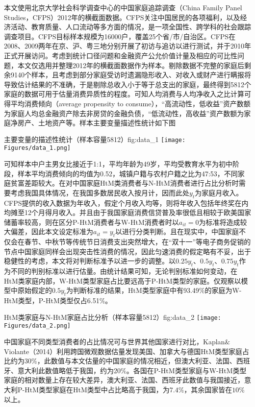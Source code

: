 \documentclass[supercite]{HustGraduPaper}
\begin{document}
    本文使用北京大学社会科学调查中心的中国家庭追踪调查（China Family Panel Studies，CFPS）2012年的横截面数据。CFPS关注中国居民的各项福利，以及经济活动、教育质量、人口流动等多方面的情况，是一项全国性、跨学科的社会跟踪调查项目。CFPS目标样本规模为16000户，覆盖25个省/市/自治区。CFPS在2008、2009两年在京、沪、粤三地分别开展了初访与追访以进行测试，并于2010年正式开展访问。考虑到统计口径问题和金融资产公允价值计量及相应的可比性问题，本文仅选用并整理2012年的横截面数据作为样本。剔除数据不完整的家庭后剩余9140个样本，且考虑到部分家庭受访时遗漏隐形收入、对收入或财产进行瞒报将导致估计结果的不准确，于是剔除总收入小于等于总支出的家庭，最终得到5812个家庭的数据可用于估量消费异质性的程度。可知人均消费与人均净收入之比计算可得平均消费倾向（average propensity to consume），“高流动性，低收益”资产数额为家庭人均总金融资产除去非房贷的金融负债，“低流动性，高收益”资产数额为家庭净房产、土地资产等。样本主要变量描述性统计如下图
    \begin{generalfig}[htbp]{主要变量的描述性统计（样本容量5812）}{fig:data_1}
    \texttt{[image: Figures/data\_1.png]}
    \end{generalfig}
    
    可知样本中户主男女比接近于1:1，平均年龄为49岁，平均受教育水平为初中阶段，样本平均消费倾向的均值为0.52，城镇户籍与农村户籍之比为47:53，不同家庭贫富差距较大。在对中国家庭HtM类消费者与N-HtM消费者进行占比分析时需要考虑我国具体情况，在我国多数居民收入按月计，因而此处$y_t$为家庭月收入。CFPS提供的收入数据为年收入，假定个月收入均等，则将年收入包括年终奖在内均摊至12个月得月收入。并且由于我国家庭消费信贷普及率很低且相较于欧美国家储蓄率较高，则在区分P-HtM消费者与W-HtM消费者时以$a_{it}=0$为标准将造成较大偏差，因此本文设定标准为$a_{it}=y_t$以进行分类判断。且在现实中，中国家庭不仅会在春节、中秋节等传统节日消费支出突然增大，在“双十一”等电子商务促销的节点中国家庭同样会出现突击性消费的情况，因此匀速消费的假定略有不妥，出于稳健性的考虑，本文将对判断标准予以进一步的调整。以$0.25y_t$、$0.5y_t$、$0.75y_t$作为不同的判别标准以进行估量。由统计结果可知，无论判别标准如何变动，在HtM类家庭内部，W-HtM类型家庭占比要远高于P-HtM类型的家庭。仅观察以模型中原始假定的$0.5y_t$为判断标准的结果，HtM类型家庭中有93.49$\%$的家庭为W-HtM类型，P-HtM类型仅占6.51$\%$。
    \begin{generalfig}[htbp]{HtM类家庭与N-HtM家庭占比分析（样本容量5812）}{fig:data_2}
    \texttt{[image: Figures/data\_2.png]}
    \end{generalfig}
    
    中国家庭不同类型消费者的占比情况可与世界其他国家进行对比，Kaplan$\&$Violante（2014）利用跨国微观数据估量发现美国、加拿大与德国HtM类型家庭占比约为30$\%$，此数值与本文估量的中国家庭的情况相近，但澳大利亚、法国、西班牙、意大利此数值略低于我国，约为20$\%$。各国在P-HtM类型家庭与W-HtM类型家庭的相对数量上存在较大差异，澳大利亚、法国、西班牙此数值与我国接近，意大利P-HtM类型家庭在HtM类型中占比略高于我国，为$7.4\%$，其余国家皆在$10\%$以上。
\end{document}
